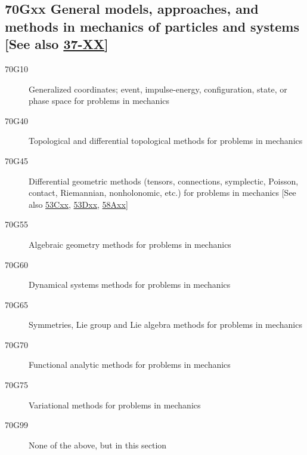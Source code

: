 \subsection*{70Gxx  General models, approaches, and methods in mechanics of particles and systems [See also \hyperref[37-XX]{37-XX}] }\label{70Gxx}
\begin{description}  
\item [70G10]\label{70G10} Generalized coordinates; event, impulse-energy, configuration, state, or phase space for problems in mechanics
\item [70G40]\label{70G40} Topological and differential topological methods for problems in mechanics
\item [70G45]\label{70G45} Differential geometric methods (tensors, connections, symplectic, Poisson, contact, Riemannian, nonholonomic, etc.) for problems in mechanics [See also \hyperref[53Cxx]{53Cxx}, \hyperref[53Dxx]{53Dxx}, \hyperref[58Axx]{58Axx}]
\item [70G55]\label{70G55} Algebraic geometry methods for problems in mechanics
\item [70G60]\label{70G60} Dynamical systems methods for problems in mechanics
\item [70G65]\label{70G65} Symmetries, Lie group and Lie algebra methods for problems in mechanics
\item [70G70]\label{70G70} Functional analytic methods for problems in mechanics
\item [70G75]\label{70G75} Variational methods for problems in mechanics
\item [70G99]\label{70G99} None of the above, but in this section
\end{description}
